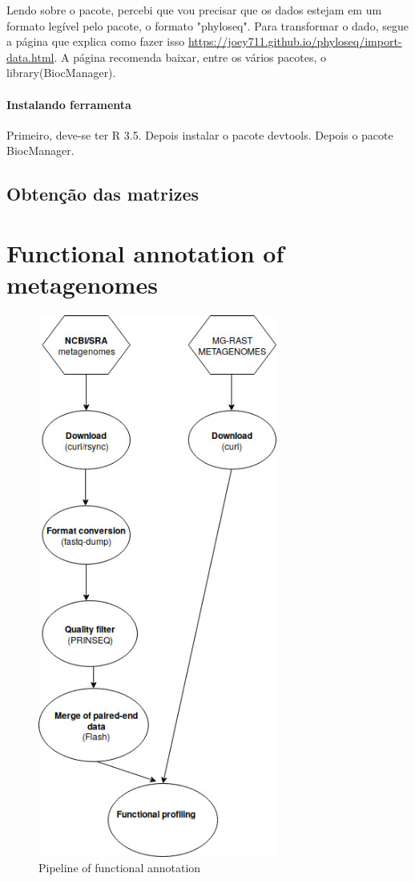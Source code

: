 \documentclass[12pt, a4paper]{report}
\begin{document}
Lendo sobre o pacote, percebi que vou precisar que os dados estejam em um formato legível pelo pacote, o formato "phyloseq". Para transformar o dado, segue a página que explica como fazer isso \url{https://joey711.github.io/phyloseq/import-data.html}.
A página recomenda baixar, entre os vários pacotes, o library(BiocManager). 
\subsubsection{Instalando ferramenta}
Primeiro, deve-se ter R 3.5. Depois instalar o pacote devtools. Depois o pacote BiocManager. 

\section{Obtenção das matrizes}




\newpage
\chapter{Functional annotation of metagenomes}
\begin{figure}
  \centering 
  \includegraphics[width=0.7\textwidth]{figures/pipeline_functional.jpg}
  \caption{Pipeline of functional annotation}
  \end{figure}
\end{document}
